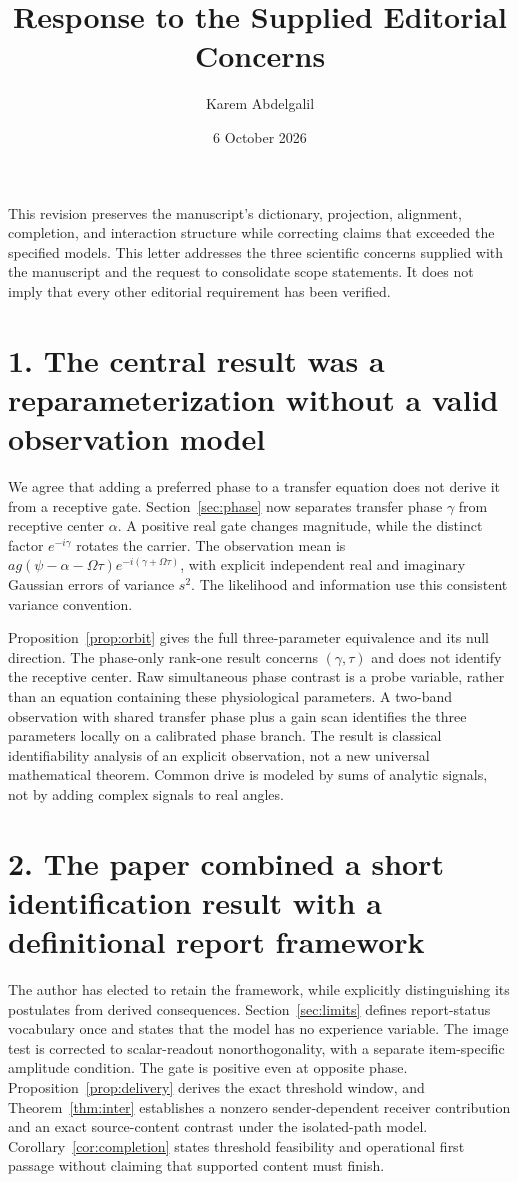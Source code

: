 \documentclass[11pt,a4paper]{article}
\title{Response to the Supplied Editorial Concerns}
\author{Karem Abdelgalil}\date{6 October 2026}
\begin{document}
\maketitle
This revision preserves the manuscript's dictionary, projection, alignment, completion, and interaction structure while correcting claims that exceeded the specified models. This letter addresses the three scientific concerns supplied with the manuscript and the request to consolidate scope statements. It does not imply that every other editorial requirement has been verified.

\section*{1. The central result was a reparameterization without a valid observation model}
We agree that adding a preferred phase to a transfer equation does not derive it from a receptive gate. Section~\ref{sec:phase} now separates transfer phase $\gamma$ from receptive center $\alpha$. A positive real gate changes magnitude, while the distinct factor $e^{-i\gamma}$ rotates the carrier. The observation mean is $a g(\psi-\alpha-\Omega\tau)e^{-i(\gamma+\Omega\tau)}$, with explicit independent real and imaginary Gaussian errors of variance $s^2$. The likelihood and information use this consistent variance convention.

Proposition~\ref{prop:orbit} gives the full three-parameter equivalence and its null direction. The phase-only rank-one result concerns $(\gamma,\tau)$ and does not identify the receptive center. Raw simultaneous phase contrast is a probe variable, rather than an equation containing these physiological parameters. A two-band observation with shared transfer phase plus a gain scan identifies the three parameters locally on a calibrated phase branch. The result is classical identifiability analysis of an explicit observation, not a new universal mathematical theorem. Common drive is modeled by sums of analytic signals, not by adding complex signals to real angles.

\section*{2. The paper combined a short identification result with a definitional report framework}
The author has elected to retain the framework, while explicitly distinguishing its postulates from derived consequences. Section~\ref{sec:limits} defines report-status vocabulary once and states that the model has no experience variable. The image test is corrected to scalar-readout nonorthogonality, with a separate item-specific amplitude condition. The gate is positive even at opposite phase. Proposition~\ref{prop:delivery} derives the exact threshold window, and Theorem~\ref{thm:inter} establishes a nonzero sender-dependent receiver contribution and an exact source-content contrast under the isolated-path model. Corollary~\ref{cor:completion} states threshold feasibility and operational first passage without claiming that supported content must finish.
\end{document}
